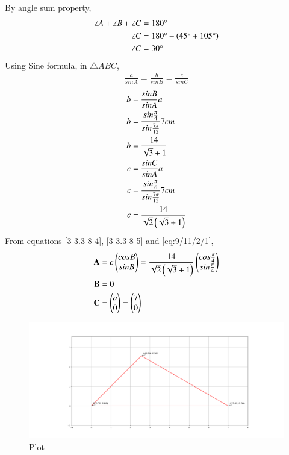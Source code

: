 \documentclass[journal]{IEEEtran}
\begin{document}
By angle sum property,
\begin{align}
    \angle{A}+\angle{B}+\angle{C}&=180\degree\\
    \angle{C}&=180\degree-\left(45\degree+105\degree\right)\\
    \angle{C}&=30\degree\label{3-3.3-8-3}
\end{align}
Using Sine formula, in $\triangle ABC$,
\begin{align}
    \frac{a}{sin A}=\frac{b}{sin B}=\frac{c}{sin C}
\end{align}
 \begin{align}
    b&=\frac{sin B}{sin A}a\\
    b&=\frac{sin \frac{\pi}{4}}{sin \frac{7\pi}{12}}7cm\\
    b&=\frac{14}{\sqrt{3}+1}\label{3-3.3-8-4}\\
    c&=\frac{sin C}{sin A}a\\
    c&=\frac{sin \frac{\pi}{6}}{sin \frac{7\pi}{12}}7cm\\
    c&=\frac{14}{\sqrt{2}\left(\sqrt{3}+1\right)}\label{3-3.3-8-5}
\end{align}
 From equations \eqref{3-3.3-8-4}, \eqref{3-3.3-8-5} and  
 \eqref{eq:9/11/2/1},
\begin{align}
\mathbf{A}&=c\begin{pmatrix}cos B\\ sin B\end{pmatrix}=\frac{14}{\sqrt{2}\left(\sqrt{3}+1\right)}\begin{pmatrix}cos \frac{\pi}{4}\\ sin \frac{\pi}{4}\end{pmatrix}\\
\mathbf{B}&=0\\
\mathbf{C}&=\begin{pmatrix}a \\ 0\end{pmatrix}=\begin{pmatrix}7\\0\end{pmatrix}
\end{align}
\begin{figure}[h!]
   \centering
   \includegraphics[width=1.1\columnwidth]{Figs/Figure_1.png}
   \caption{Plot}
   \label{3-3.3-8-Figure}
\end{figure}
\end{document}
